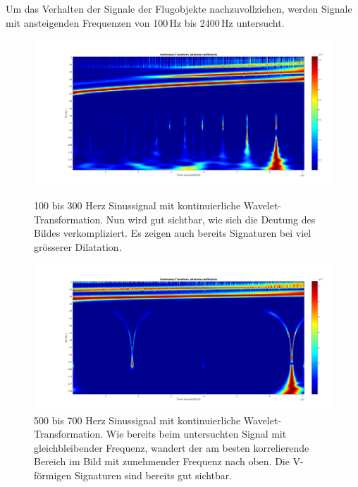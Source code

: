 \begin{refsection}
Um das Verhalten der Signale der Flugobjekte nachzuvollziehen, werden Signale mit ansteigenden Frequenzen von 100\,Hz bis 2400\,Hz untersucht.
\begin{figure}
	\centering
	\includegraphics[width=0.9\linewidth]{papers/meteor/images/anomalie/sweep/cwt_0100to0300hz.png}
	\caption{100 bis 300 Herz Sinussignal mit kontinuierliche Wavelet-Transformation.
	Nun wird gut sichtbar, wie sich die Deutung des Bildes verkompliziert. 
	Es zeigen auch bereits Signaturen bei viel grösserer Dilatation.}
	\includegraphics[width=0.9\linewidth]{papers/meteor/images/anomalie/sweep/cwt_0500to0700hz.png}
	\caption{500 bis 700 Herz Sinussignal mit kontinuierliche Wavelet-Transformation.
	Wie bereits beim untersuchten Signal mit gleichbleibender Frequenz, wandert der am besten korrelierende Bereich im Bild mit zunehmender Frequenz nach oben.
	Die V-förmigen Signaturen sind bereits gut sichtbar.}
	\label{fig:cwt_anomalie_beam_1}
\end{figure}


\end{refsection}

